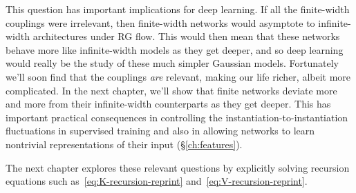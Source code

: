 This question has important implications for deep learning. If all the finite-width couplings were irrelevant, then finite-width networks would asymptote to infinite-width architectures under RG flow.
This would then mean that these networks behave more like infinite-width models as they get deeper, and so deep learning would really be the study of these much simpler Gaussian models.
Fortunately
we'll soon find that the couplings \emph{are} relevant, making our life richer, albeit more complicated. In the next chapter, we'll show that finite networks deviate more and more from their infinite-width counterparts as they get deeper. This has important practical consequences in controlling the instantiation-to-instantiation fluctuations in supervised training 
and also in allowing networks to learn nontrivial representations of their input (\S\ref{ch:features}).

The next chapter explores these relevant questions by explicitly solving recursion equations such as~\eqref{eq:K-recursion-reprint} and~\eqref{eq:V-recursion-reprint}.



 




















































